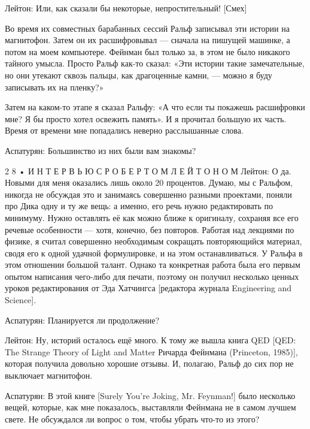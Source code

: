 \documentclass[10pt,oneside]{article}
\begin{document}
Лейтон: Или, как сказали бы некоторые, непростительный! [Смех]\par

Во время их совместных барабанных сессий Ральф записывал эти истории на магнитофон. Затем он их расшифровывал --- сначала на пишущей машинке, а потом на моем компьютере. Фейнман был только за, в этом не было никакого тайного умысла. Просто Ральф как-то сказал: «Эти истории такие замечательные, но они утекают сквозь пальцы, как драгоценные камни, --- можно я буду записывать их на пленку?»\par

Затем на каком-то этапе я сказал Ральфу: «А что если ты покажешь расшифровки мне? Я бы просто хотел освежить память». И я прочитал большую их часть. Время от времени мне попадались неверно расслышанные слова.\par

Аспатурян: Большинство из них были вам знакомы?\par

2 8 • И Н Т Е Р В Ь Ю   С   Р О Б Е Р Т О М   Л Е Й Т О Н О М Лейтон: О да. Новыми для меня оказались лишь около 20 процентов. Думаю, мы с Ральфом, никогда не обсуждая это и занимаясь совершенно разными проектами, поняли про Дика одну и ту же вещь: а именно, его речь нужно редактировать по минимуму. Нужно оставлять её как можно ближе к оригиналу, сохраняя все его речевые особенности --- хотя, конечно, без повторов. Работая над лекциями по физике, я считал совершенно необходимым сокращать повторяющийся материал, сводя его к одной удачной формулировке, и на этом останавливаться. У Ральфа в этом отношении большой талант. Однако та конкретная работа была его первым опытом написания чего-либо для печати, поэтому он получил несколько ценных уроков редактирования от Эда Хатчингса [редактора журнала Engineering and Science].\par

Аспатурян: Планируется ли продолжение?\par

Лейтон: Ну, историй осталось ещё много. К тому же вышла книга QED [QED: The Strange Theory of Light and Matter Ричарда Фейнмана (Princeton, 1985)], которая получила довольно хорошие отзывы. И, полагаю, Ральф до сих пор не выключает магнитофон.\par

Аспатурян: В этой книге [Surely You’re Joking, Mr. Feynman!] было несколько вещей, которые, как мне показалось, выставляли Фейнмана не в самом лучшем свете. Не обсуждался ли вопрос о том, чтобы убрать что-то из этого?\par
\end{document}
